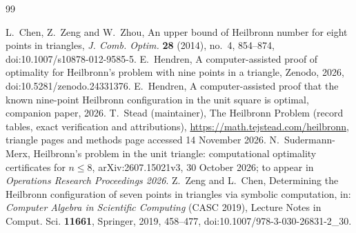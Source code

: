 \documentclass[11pt]{amsart}
\theoremstyle{definition}
\begin{document}
\begin{thebibliography}{99}

 L.~Chen, Z.~Zeng and W.~Zhou, An upper bound of Heilbronn number for eight points in triangles, \emph{J. Comb. Optim.} \textbf{28} (2014), no.~4, 854--874, doi:10.1007/s10878-012-9585-5.
 E.~Hendren, A computer-assisted proof of optimality for Heilbronn's problem with nine points in a triangle, Zenodo, 2026, doi:10.5281/zenodo.24331376.
 E.~Hendren, A computer-assisted proof that the known nine-point Heilbronn configuration in the unit square is optimal, companion paper, 2026.
 T.~Stead (maintainer), The Heilbronn Problem (record tables, exact verification and attributions), \url{https://math.tejstead.com/heilbronn}, triangle pages and methods page accessed 14 November 2026.
 N.~Sudermann-Merx, Heilbronn's problem in the unit triangle: computational optimality certificates for $n \le 8$, arXiv:2607.15021v3, 30 October 2026; to appear in \emph{Operations Research Proceedings 2026}.
 Z.~Zeng and L.~Chen, Determining the Heilbronn configuration of seven points in triangles via symbolic computation, in: \emph{Computer Algebra in Scientific Computing} (CASC 2019), Lecture Notes in Comput. Sci. \textbf{11661}, Springer, 2019, 458--477, doi:10.1007/978-3-030-26831-2\_30.

\end{thebibliography}
\end{document}
